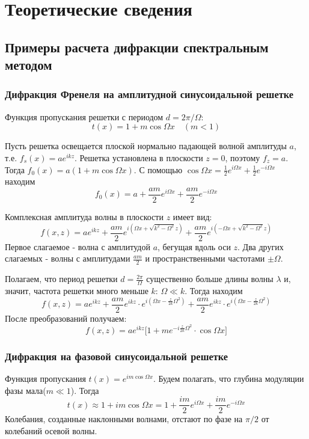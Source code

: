 \documentclass[a4paper,12pt]{article}
\begin{document}
\section{Теоретические сведения}

\subsection{Примеры расчета дифракции спектральным методом}

\subsubsection{Дифракция Френеля на амплитудной синусоидальной решетке}
Функция пропускания решетки с периодом $d=2\pi/\Omega$:
$$
t(x) = 1+m\cos{\Omega x} \quad (m < 1)
$$

Пусть решетка освещается плоской нормально падающей волной амплитуды $a$, т.е. $f_s(x)=ae^{ikz}$. Решетка установлена в плоскости $z=0$, поэтому $f_z=a$. Тогда $f_0(x) = a(1+m\cos{\Omega x})$. С помощью $\cos{\Omega x}=\frac{1}{2}e^{i\Omega x} + \frac{1}{2}e^{-i\Omega x}$ находим
$$
f_0(x) = a+\frac{am}{2}e^{i\Omega x} + \frac{am}{2}e^{-i\Omega x}
$$

Комплексная амплитуда волны в плоскости $z$ имеет вид:
$$
f(x,z)=ae^{ikz} + \frac{am}{2}e^{i(\Omega x + \sqrt{k^2-\Omega^2}z)} + \frac{am}{2}e^{i(-\Omega x+\sqrt{k^2-\Omega^2}z)}
$$
Первое слагаемое - волна с амплитудой $a$, бегущая вдоль оси $z$. Два других слагаемых - волны с амплитудами $\frac{am}{2}$ и пространственными частотами $\pm\Omega$. 

Полагаем, что период решетки $d = \frac{2\pi}{\Omega}$ существенно больше длины волны $\lambda$ и, значит, частота решетки много меньше $k$: $\Omega \ll k$. Тогда находим
$$
f(x,z)=ae^{ikz}+\frac{am}{2}e^{ikz} \cdot e^{i(\Omega x - \frac{z}{2k}\Omega^2)} + \frac{am}{2}e^{ikz}\cdot e^{i(\Omega x-\frac{z}{2k}\Omega^2)}
$$
После преобразований получаем:
$$
f(x,z) = ae^{ikz}\Big[1+me^{-i\frac{z}{2k}\Omega^2}\cdot\cos{\Omega x}\Big]
$$

\subsubsection{Дифракция на фазовой синусоидальной решетке}
Функция пропускания $t(x)=e^{im\cos{\Omega x}}$. Будем полагать, что глубина модуляции фазы мала($m\ll 1$). Тогда
$$
t(x)\approx 1+im\cos{\Omega x}=1+\frac{im}{2}e^{i\Omega x} +\frac{im}{2}e^{-i\Omega x}
$$
Колебания, созданные наклонными волнами, отстают по фазе на $\pi/2$ от колебаний осевой волны.
\end{document}
